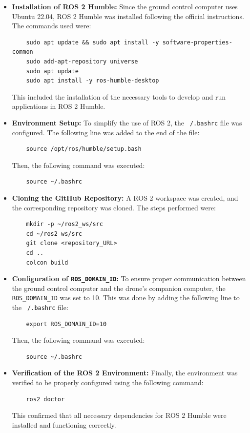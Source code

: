 \begin{itemize}
    \item \textbf{Installation of ROS 2 Humble:} 
    Since the ground control computer uses Ubuntu 22.04, ROS 2 Humble was installed following the official instructions. The commands used were:
    \begin{verbatim}
    sudo apt update && sudo apt install -y software-properties-common
    sudo add-apt-repository universe
    sudo apt update
    sudo apt install -y ros-humble-desktop
    \end{verbatim}
    This included the installation of the necessary tools to develop and run applications in ROS 2 Humble.

    \item \textbf{Environment Setup:} 
    To simplify the use of ROS 2, the \texttt{~/.bashrc} file was configured. The following line was added to the end of the file:
    \begin{verbatim}
    source /opt/ros/humble/setup.bash
    \end{verbatim}
    Then, the following command was executed:
    \begin{verbatim}
    source ~/.bashrc
    \end{verbatim}

    \item \textbf{Cloning the GitHub Repository:} 
    A ROS 2 workspace was created, and the corresponding repository was cloned. The steps performed were:
    \begin{verbatim}
    mkdir -p ~/ros2_ws/src
    cd ~/ros2_ws/src
    git clone <repository_URL>
    cd ..
    colcon build
    \end{verbatim}

    \item \textbf{Configuration of \texttt{ROS\_DOMAIN\_ID}:} 
    To ensure proper communication between the ground control computer and the drone's companion computer, the \texttt{ROS\_DOMAIN\_ID} was set to 10. This was done by adding the following line to the \texttt{~/.bashrc} file:
    \begin{verbatim}
    export ROS_DOMAIN_ID=10
    \end{verbatim}
    Then, the following command was executed:
    \begin{verbatim}
    source ~/.bashrc
    \end{verbatim}
    
    \item \textbf{Verification of the ROS 2 Environment:} 
    Finally, the environment was verified to be properly configured using the following command:
    \begin{verbatim}
    ros2 doctor
    \end{verbatim}
    This confirmed that all necessary dependencies for ROS 2 Humble were installed and functioning correctly.
    
\end{itemize}

